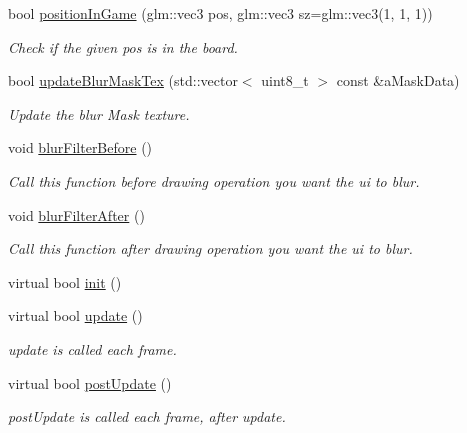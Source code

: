 \begin{DoxyCompactItemize}
bool \hyperlink{class_scene_game_a0d5f3a9ca2d04f3c4fa26813614b555c}{position\+In\+Game} (glm\+::vec3 pos, glm\+::vec3 sz=glm\+::vec3(1, 1, 1))
\begin{DoxyCompactList}\small\item\em Check if the given pos is in the board. \end{DoxyCompactList}\item 
bool \hyperlink{class_scene_game_a8479e23eab1b5b0a5501bcf029846639}{update\+Blur\+Mask\+Tex} (std\+::vector$<$ uint8\+\_\+t $>$ const \&a\+Mask\+Data)
\begin{DoxyCompactList}\small\item\em Update the blur Mask texture. \end{DoxyCompactList}\item 
\mbox{\label{class_scene_game_a7d060188f3532490031c741d68ac4021}} 
void \hyperlink{class_scene_game_a7d060188f3532490031c741d68ac4021}{blur\+Filter\+Before} ()
\begin{DoxyCompactList}\small\item\em Call this function before drawing operation you want the ui to blur. \end{DoxyCompactList}\item 
\mbox{\label{class_scene_game_ac8fd2b17911c6688d11318c4cfcac9a2}} 
void \hyperlink{class_scene_game_ac8fd2b17911c6688d11318c4cfcac9a2}{blur\+Filter\+After} ()
\begin{DoxyCompactList}\small\item\em Call this function after drawing operation you want the ui to blur. \end{DoxyCompactList}\item 
virtual bool \hyperlink{class_scene_game_a841268ba3ea129f7c02cfafcafd32a4f}{init} ()
\item 
virtual bool \hyperlink{class_scene_game_a5e23048e3ad8c6fde2d753ed7449e2d5}{update} ()
\begin{DoxyCompactList}\small\item\em update is called each frame. \end{DoxyCompactList}\item 
virtual bool \hyperlink{class_scene_game_a074516c60084a30fea0eb34cbf0b57c9}{post\+Update} ()
\begin{DoxyCompactList}\small\item\em post\+Update is called each frame, after update. \end{DoxyCompactList}\item 

\end{DoxyCompactItemize}
